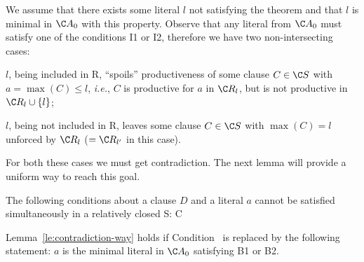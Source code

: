 \begin{PROOF} We assume that there exists some literal $l$ not satisfying
the theorem and that $l$ is minimal in \(\C A_0\) with this property.
Observe that any literal from \(\C A_0\) must satisfy one of the conditions 
I1 or I2, therefore we have two non-intersecting cases:
\begin{description}\MyLPar
\item[B1.] $l$, being included in \C R, ``spoils'' productiveness of some 
  clause \(C\in\C S\) with \(a=\max (C) \leq l\), {\em i.e.}, $C$ is productive
  for $a$ in \(\C R_l\), but is not productive in \(\C R_l\cup\{l\}\);
\item[B2.] $l$, being not included in \C R, leaves 
 some clause \(C\in\C S\) with \(\max (C)=l\) unforced by \(\C R_l\) 
(\(=\C R_{l'}\) in this case).
\end{description}

For both these cases we must get contradiction. The next lemma
will provide a uniform way to reach this goal.
\begin{LEMMA}\label {le:contradiction-way}
The following conditions about a clause $D$ and a literal $a$ cannot be 
satisfied simultaneously in a relatively closed \C S:
\newITEM C
\end{LEMMA}

\begin{COROLLARY} \label{cor:contradiction-way}
Lemma~\ref {le:contradiction-way} holds if Condition~ is replaced by the
following  statement:  $a$ is the minimal literal in \(\C A_0\) satisfying
B1 or B2.
\end{COROLLARY}


\end{PROOF}
